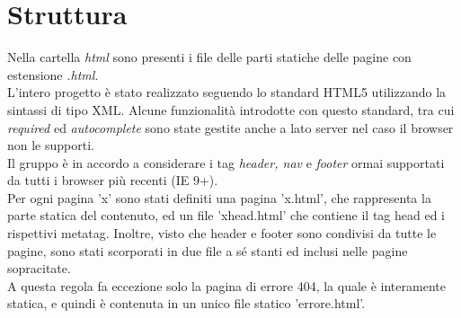 \section{Struttura}
Nella cartella \textit{html} sono presenti i file delle parti statiche delle pagine con estensione \textit{.html}.\\
L'intero progetto è stato realizzato seguendo lo standard HTML5 utilizzando la sintassi di tipo XML. Alcune funzionalità introdotte con questo standard, tra cui \textit{required} ed \textit{autocomplete} sono state gestite anche a lato server nel caso il browser non le supporti.\\
Il gruppo è in accordo a considerare i tag \textit{header, nav} e \textit{footer} ormai supportati da tutti i browser più recenti (IE 9+).\\
Per ogni pagina 'x' sono stati definiti una pagina 'x.html', che rappresenta la parte statica del contenuto, ed un file 'x\textunderscore head.html' che contiene il tag head ed i rispettivi metatag. Inoltre, visto che header e footer sono condivisi da tutte le pagine, sono stati scorporati in due file a sé stanti ed inclusi nelle pagine sopracitate. \\
A questa regola fa eccezione solo la pagina di errore 404, la quale è interamente statica, e quindi è contenuta in un unico file statico 'errore.html'.


\newpage